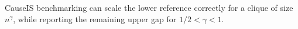 CauseIS benchmarking can scale the lower reference correctly for a clique of size \(n^{\gamma}\), while reporting the remaining upper gap for \(1/2<\gamma<1\).